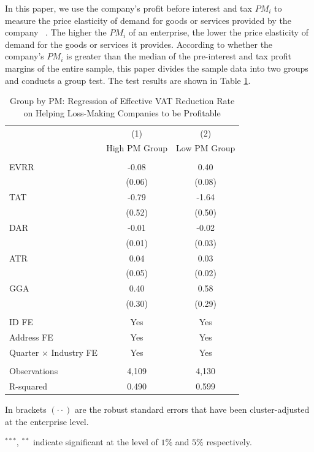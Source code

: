 \documentclass[3p,times]{elsarticle}
\begin{document}
In this paper, we use the company's profit before interest and tax $PM_i$ to measure the price elasticity of demand for goods or services provided by the company {\color{red}~\cite{jacob}}. The higher the $PM_i$ of an enterprise, the lower the price elasticity of demand for the goods or services it provides. According to whether the company's $PM_i$ is greater than the median of the pre-interest and tax profit margins of the entire sample, this paper divides the sample data into two groups and conducts a group test. The test results are shown in Table \ref{tab:Elas_demand_price}.
\begin{table}[htp!]
    \centering
    \caption{Group by PM: Regression of Effective VAT Reduction Rate on Helping Loss-Making Companies to be Profitable}
    \begin{threeparttable}
    \begin{tabular}{l|cc}%
        \toprule\toprule
         & (1) & (2)\\
         &High PM Group & Low PM Group\\
         \hline
         &  &    \\
        EVRR&-0.08&	0.40\tnote{***}\\
        &(0.06)&	(0.08)\\
        TAT&-0.79&	-1.64\tnote{***}\\
        &(0.52)	&(0.50)\\
        DAR&-0.01&	-0.02\\
        &(0.01)&	(0.03)\\
        ATR&0.04&	0.03\\
        &(0.05)&	(0.02)\\
        GGA&0.40&	0.58\tnote{**}\\
        &(0.30)&	(0.29)\\
        
          &  &   \\
        ID FE & Yes & Yes  \\
        Address FE & Yes & Yes  \\
        Quarter $\times$ Industry FE & Yes & Yes  \\
         &  &    \\
        
        Observations& 4,109	&4,130
         \\
        R-squared &0.490&	0.599	\\
        \bottomrule
    \end{tabular}
    \begin{tablenotes}
        \item In brackets $(\cdot\cdot)$ are the robust standard errors that have been cluster-adjusted at the enterprise level.
        \item $^{***}$, $^{**}$ indicate significant at the level of $1\%$ and $5\%$ respectively.
    \end{tablenotes}
    \end{threeparttable}
    \label{tab:Elas_demand_price}
\end{table}
\end{document}
